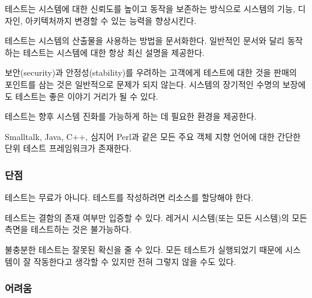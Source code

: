 \documentclass[a4paper,10pt,twoside]{book}
\begin{document}
\begin{bulletlist}
\item 테스트는 시스템에 대한 신뢰도를 높이고 동작을 보존하는 방식으로 시스템의 기능, 디자인, 아키텍처까지 변경할 수 있는 능력을 향상시킨다.
\item 테스트는 시스템의 산출물을 사용하는 방법을 문서화한다. 일반적인 문서와 달리 동작하는 테스트는 시스템에 대한 항상 최신 설명을 제공한다.
\item 보안(security)과 안정성(stability)를 우려하는 고객에게 테스트에 대한 것을 판매의 포인트를 삼는 것은 일반적으로 문제가 되지 않는다. 시스템의 장기적인 수명의 보장에도 테스트는 좋은 이야기 거리가 될 수 있다.
\item 테스트는 향후 시스템 진화를 가능하게 하는 데 필요한 환경을 제공한다.
\item Smalltalk, Java, C++, 심지어 Perl과 같은 모든 주요 객체 지향 언어에 대한 간단한 단위 테스트 프레임워크가 존재한다.
\end{bulletlist}

\subsubsection*{단점}

\begin{bulletlist}
\item 테스트는 무료가 아니다. 테스트를 작성하려면 리소스를 할당해야 한다.
\item 테스트는 결함의 존재 여부만 입증할 수 있다. 레거시 시스템(또는 모든 시스템)의 모든 측면을 테스트하는 것은 불가능하다.
\item 불충분한 테스트는 잘못된 확신을 줄 수 있다. 모든 테스트가 실행되었기 때문에 시스템이 잘 작동한다고 생각할 수 있지만 전혀 그렇지 않을 수도 있다.
\end{bulletlist}

\subsubsection*{어려움}
\end{document}
